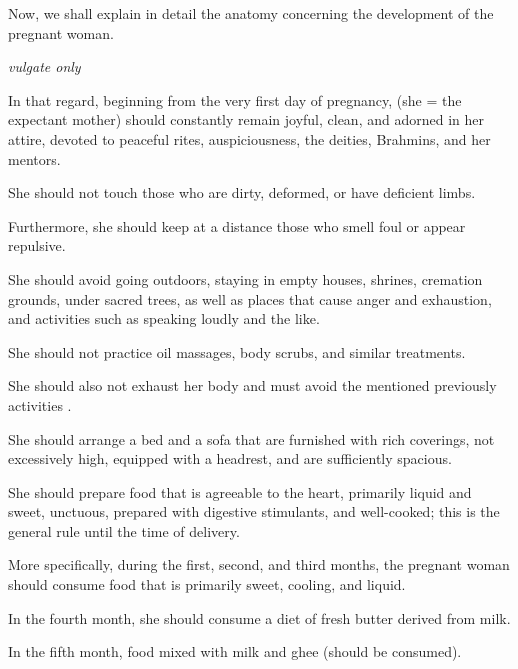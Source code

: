 \begin{translation}
 
 
 \begin{tt}
     \raggedright
     \bigskip
     
        
\item[1]

Now, we shall explain in detail the anatomy concerning the development
of the pregnant woman.

\item[2] \emph{vulgate only}

\item[3]

In that regard, beginning from the very first day of pregnancy, (she =
the expectant mother) should constantly remain joyful, clean, and
adorned in her attire, devoted to peaceful rites, auspiciousness, the
deities, Brahmins, and her mentors.

She should not touch those who are dirty, deformed, or have deficient
limbs.

Furthermore, she should keep at a distance those who smell foul or
appear repulsive.

She should avoid going outdoors, staying in empty houses, shrines,
cremation grounds, under sacred trees, as well as places that cause
anger and exhaustion, and activities such as speaking loudly and the
like.

She should not practice oil massages, body scrubs, and similar
treatments.

She should also not exhaust her body and must avoid the mentioned
previously activities .

She should arrange a bed and a sofa that are furnished with rich
coverings, not excessively high, equipped with a headrest, and are
sufficiently spacious.

She should prepare food that is agreeable to the heart, primarily liquid
and sweet, unctuous, prepared with digestive stimulants, and
well-cooked; this is the general rule until the time of delivery.

\item[4]

More specifically, during the first, second, and third months, the
pregnant woman should consume food that is primarily sweet, cooling, and
liquid.

In the fourth month, she should consume a diet of fresh butter derived
from milk.

In the fifth month, food mixed with milk and ghee (should be consumed).


\end{tt}
\end{translation}
